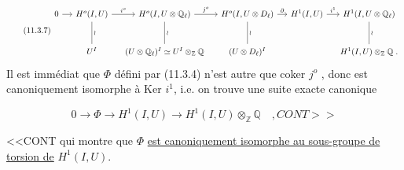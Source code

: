 \begin{equation}\tag{11.3.7}
\begin{tikzcd}[column sep=small, row sep=large]
0 \arrow[r] & H^o(I,U) \arrow[r, "i^o"] \arrow[d, dash, "\wr"] & H^o(I,U\otimes\mathbb{Q}_\ell) \arrow[r, "j^o"] \arrow[d, dash, "\wr"] & H^o(I,U\otimes D_\ell) \arrow[r, "\partial"] \arrow[d, dash, "\wr"] & H^1(I,U) \arrow[r, "i^1"] & H^1(I,U\otimes\mathbb{Q}_\ell) \arrow[d, dash, "\wr"] \\
{} & U^I & (U\otimes\mathbb{Q}_\ell)^I \simeq U^I\otimes_{\mathbb{Z}}\mathbb{Q} & (U\otimes D_\ell)^I & {} & H^1(I,U)\otimes_{\mathbb{Z}}\mathbb{Q} \;.
\end{tikzcd}
\end{equation}
Il est immédiat que $\Phi$ défini par (11.3.4) n'est autre que coker $j^o$ , donc est canoniquement isomorphe à Ker $i^1$, i.e. on trouve une suite exacte canonique

\begin{equation}\tag{11.3.8}
0 \longrightarrow \Phi \longrightarrow H^1(I,U) \longrightarrow H^1(I,U)\otimes_{\mathbb{Z}}\mathbb{Q} \quad , CONT>>
\end{equation}


<<CONT qui montre que $\Phi$ \underline{est canoniquement isomorphe au sous-groupe de torsion de} $H^1(I,U)$.


